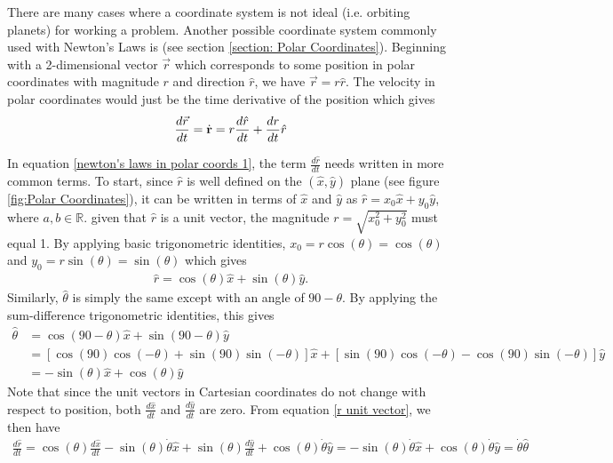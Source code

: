 There are many cases where a  coordinate system is not ideal (i.e. orbiting planets) for working a problem. Another possible coordinate system commonly used with Newton's Laws is  (see section \ref{section: Polar Coordinates}). Beginning with a 2-dimensional vector $\vec{r}$ which corresponds to some position in polar coordinates with magnitude $r$ and direction $\hat{r}$, we have $\vec{r} = r\hat{r}$. The velocity in polar coordinates would just be the time derivative of the position which gives
\begin{align}
\frac{d \vec{r}}{dt} = \dot{\text{\textbf{r}}}= r\frac{d\hat{r}}{dt} + \frac{dr}{dt}\hat{r} \label{newton's laws in polar coords 1}
\end{align}

In equation \ref{newton's laws in polar coords 1}, the term $\frac{d\hat{r}}{dt}$ needs written in more common terms. To start, since $\hat{r}$ is well defined on the $(\hat{x}, \hat{y})$ plane (see figure \ref{fig:Polar Coordinates}), it can be written in terms of $\hat{x}$ and $\hat{y}$ as $\hat{r} = x_0\hat{x} + y_0\hat{y}$, where $a, b \in \mathbb{R}$. given that $\hat{r}$ is a unit vector, the magnitude $r=\sqrt{x_0^2+y_0^2}$ must equal 1. By applying basic trigonometric identities, $x_0=r\cos(\theta)=\cos(\theta)$ and $y_0=r\sin(\theta)=\sin(\theta)$ which gives
\begin{align}
\hat{r} = \cos(\theta)\hat{x} + \sin(\theta)\hat{y}. \label{r unit vector}
\end{align} 
Similarly, $\hat{\theta}$ is simply the same except with an angle of $90-\theta$. By applying the sum-difference trigonometric identities, this gives
\begin{align}
\hat{\theta} &= \cos(90-\theta)\hat{x} + \sin(90-\theta)\hat{y} \nonumber \\ 
			 &= \left[\cos(90)\cos(-\theta)+\sin(90)\sin(-\theta)\right]\hat{x} + \left[\sin(90)\cos(-\theta)-\cos(90)\sin(-\theta)\right]\hat{y} \nonumber\\
			 &= -\sin(\theta)\hat{x} + \cos(\theta)\hat{y} \label{theta unit vector}
\end{align}
Note that since the unit vectors in Cartesian coordinates do not change with respect to position, both $\frac{d\hat{x}}{dt}$ and $\frac{d\hat{y}}{dt}$ are zero. From equation \ref{r unit vector}, we then have
\begin{align}
\frac{d\hat{r}}{dt} = \cos(\theta)\frac{d\hat{x}}{dt} - \sin(\theta)\dot{\theta}\hat{x} + \sin(\theta)\frac{d\hat{y}}{dt} + \cos(\theta)\dot{\theta}\hat{y} = -\sin(\theta)\dot{\theta}\hat{x} + \cos(\theta)\dot{\theta}\hat{y} = \dot{\theta} \hat{\theta}
\end{align}
